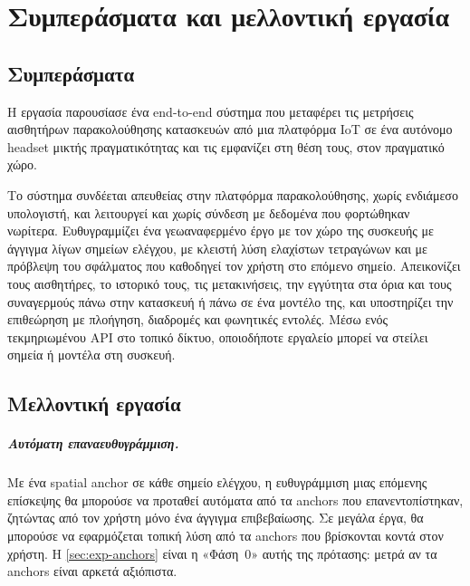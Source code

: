 \chapter{Συμπεράσματα και μελλοντική εργασία}
\label{ch:conclusions}

\section{Συμπεράσματα}
\label{sec:conclusions}

Η εργασία παρουσίασε ένα end-to-end σύστημα που μεταφέρει τις μετρήσεις αισθητήρων παρακολούθησης κατασκευών από μια πλατφόρμα IoT σε ένα αυτόνομο headset μικτής πραγματικότητας και τις εμφανίζει στη θέση τους, στον πραγματικό χώρο.

Το σύστημα συνδέεται απευθείας στην πλατφόρμα παρακολούθησης, χωρίς ενδιάμεσο υπολογιστή, και λειτουργεί και χωρίς σύνδεση με δεδομένα που φορτώθηκαν νωρίτερα. Ευθυγραμμίζει ένα γεωαναφερμένο έργο με τον χώρο της συσκευής με άγγιγμα λίγων σημείων ελέγχου, με κλειστή λύση ελαχίστων τετραγώνων και με πρόβλεψη του σφάλματος που καθοδηγεί τον χρήστη στο επόμενο σημείο. Απεικονίζει τους αισθητήρες, το ιστορικό τους, τις μετακινήσεις, την εγγύτητα στα όρια και τους συναγερμούς πάνω στην κατασκευή ή πάνω σε ένα μοντέλο της, και υποστηρίζει την επιθεώρηση με πλοήγηση, διαδρομές και φωνητικές εντολές. Μέσω ενός τεκμηριωμένου API στο τοπικό δίκτυο, οποιοδήποτε εργαλείο μπορεί να στείλει σημεία ή μοντέλα στη συσκευή.


\section{Μελλοντική εργασία}
\label{sec:future}

\paragraph{Αυτόματη επαναευθυγράμμιση.} Με ένα spatial anchor σε κάθε σημείο ελέγχου, η ευθυγράμμιση μιας επόμενης επίσκεψης θα μπορούσε να προταθεί αυτόματα από τα anchors που επανεντοπίστηκαν, ζητώντας από τον χρήστη μόνο ένα άγγιγμα επιβεβαίωσης. Σε μεγάλα έργα, θα μπορούσε να εφαρμόζεται τοπική λύση από τα anchors που βρίσκονται κοντά στον χρήστη. Η \cref{sec:exp-anchors} είναι η «Φάση~0» αυτής της πρότασης: μετρά αν τα anchors είναι αρκετά αξιόπιστα.

